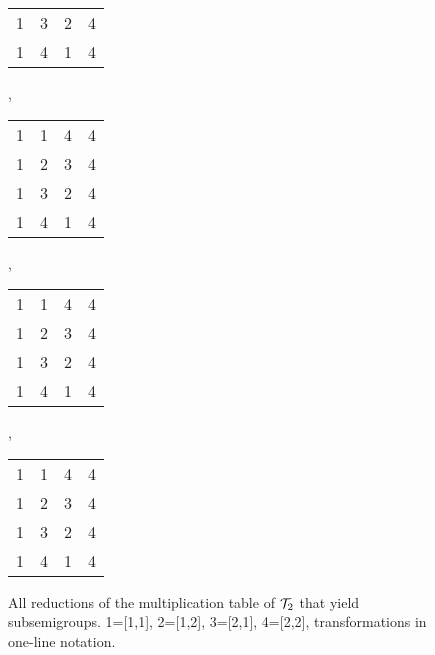 \documentclass{article}
\theoremstyle{plain}
\theoremstyle{definition}
\newcommand{\cT}{{\cal T}}
\begin{document}
\begin{figure}
\begin{center}
\begin{tabular}{@{}c@{}c@{}c@{}c@{}}
\color{lgr}1&\color{lgr}3&\color{lgr}2&\color{lgr}4\\
1&\color{lgr}4&\color{lgr}1&4\\
\end{tabular},\ \ \ 
\begin{tabular}{@{}c@{}c@{}c@{}c@{}}
1&\color{lgr}1&\color{lgr}4&\color{lgr}4\\
\color{lgr}1&\color{lgr}2&\color{lgr}3&\color{lgr}4\\
\color{lgr}1&\color{lgr}3&\color{lgr}2&\color{lgr}4\\
\color{lgr}1&\color{lgr}4&\color{lgr}1&\color{lgr}4\\
\end{tabular},\ \ \ 
\begin{tabular}{@{}c@{}c@{}c@{}c@{}}
\color{lgr}1&\color{lgr}1&\color{lgr}4&\color{lgr}4\\
\color{lgr}1&2&3&\color{lgr}4\\
\color{lgr}1&3&2&\color{lgr}4\\
\color{lgr}1&\color{lgr}4&\color{lgr}1&\color{lgr}4\\
\end{tabular},\ \ \ 
\begin{tabular}{@{}c@{}c@{}c@{}c@{}}
\color{lgr}1&\color{lgr}1&\color{lgr}4&\color{lgr}4\\
\color{lgr}1&2&\color{lgr}3&\color{lgr}4\\
\color{lgr}1&\color{lgr}3&\color{lgr}2&\color{lgr}4\\
\color{lgr}1&\color{lgr}4&\color{lgr}1&\color{lgr}4\\
\end{tabular}
\end{center}
\caption{All reductions of the multiplication table of $\cT_2$ that yield subsemigroups.  1=[1,1], 2=[1,2], 3=[2,1], 4=[2,2], transformations in one-line notation.}
\end{figure}
\end{document}
